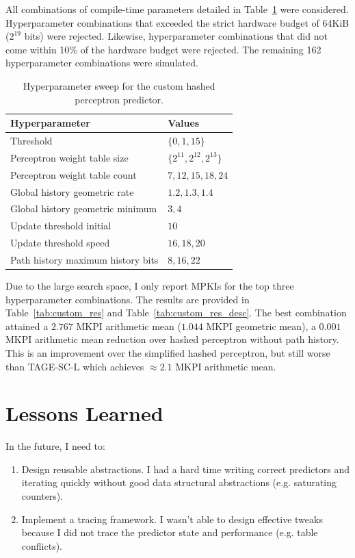 \documentclass{article}
\begin{document}
All combinations of compile-time parameters detailed in Table~\ref{tab:custom_hp} were considered. Hyperparameter combinations that exceeded the strict hardware 
budget of 64KiB ($2^{19}$ bits) were rejected. Likewise, hyperparameter combinations that did not come within 10\% of the hardware budget were rejected. The 
remaining 162 hyperparameter combinations were simulated.

\newpage

\begin{table}[h]
    \centering
    \begin{tabular}{ll}
        \toprule
        \textbf{Hyperparameter} & \textbf{Values} \\
        \midrule
        Threshold & $\{0, 1, 15\}$ \\
        Perceptron weight table size & $\{2^{11}, 2^{12}, 2^{13}\}$ \\
        Perceptron weight table count & $7, 12, 15, 18, 24$ \\
        Global history geometric rate & $1.2, 1.3, 1.4$ \\
        Global history geometric minimum & $3, 4$ \\
        Update threshold initial & $10$ \\
        Update threshold speed & $16, 18, 20$ \\
        Path history maximum history bits & $8, 16, 22$ \\
        \bottomrule
    \end{tabular}
    \caption{Hyperparameter sweep for the custom hashed perceptron predictor.}
    \label{tab:custom_hp}
\end{table}

\noindent
Due to the large search space, I only report MPKIs for the top three hyperparameter combinations. The results are provided in Table~\ref{tab:custom_res} and 
Table~\ref{tab:custom_res_desc}. The best combination attained a $2.767$ MKPI arithmetic mean ($1.044$ MKPI geometric mean), a $0.001$ MKPI arithmetic mean 
reduction over hashed perceptron without path history. This is an improvement over the simplified hashed perceptron, but still worse than TAGE-SC-L which 
achieves $\approx 2.1$ MKPI arithmetic mean.

\section{Lessons Learned}

In the future, I need to:
\begin{enumerate}
    \item Design reusable abstractions. I had a hard time writing correct predictors and iterating quickly without good data structural abstractions (e.g. 
    saturating counters).
    \item Implement a tracing framework. I wasn't able to design effective tweaks  because I did not trace the predictor state and performance (e.g. table 
    conflicts).
\end{enumerate}
\end{document}
